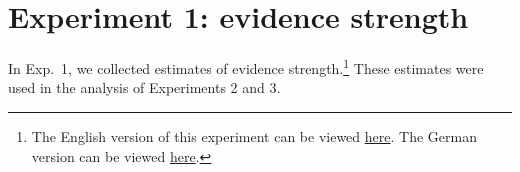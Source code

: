\documentclass[11pt]{article}
\begin{document}
%
%
%
%

\section{Experiment 1: evidence strength}

In Exp.~1, we collected estimates of evidence strength.\footnote{The English version of this experiment can be viewed \href{https://web.stanford.edu/~justinek/modals_exp/evidence.html}{here}. The German version can be viewed \href{http://web.stanford.edu/~jdegen/cgi-bin/4_dp_priors_evidencestrength/evidence.html}{here}.} These estimates were used in the analysis of Experiments 2 and 3.
\end{document}
